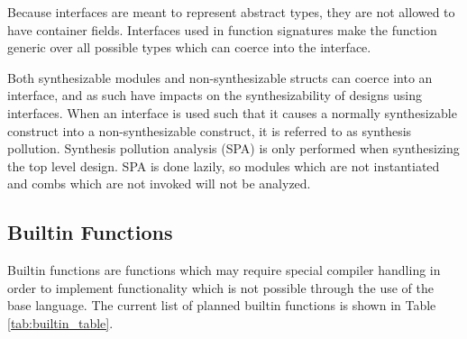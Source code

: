 \documentclass[10pt]{article}
\begin{document}
Because interfaces are meant to represent abstract types, they are not allowed to have container
fields. Interfaces used in function signatures make the function generic over all possible types
which can coerce into the interface.

Both synthesizable modules and non-synthesizable structs can coerce into an interface, and as such
have impacts on the synthesizability of designs using interfaces. When an interface is used such
that it causes a normally synthesizable construct into a non-synthesizable construct, it is referred
to as synthesis pollution. Synthesis pollution analysis (SPA) is only performed when synthesizing the top
level design. SPA is done lazily, so modules which are not instantiated and combs which are not
invoked will not be analyzed.

\subsection{Builtin Functions}
Builtin functions are functions which may require special compiler handling in order to implement
functionality which is not possible through the use of the base language. The current list of
planned builtin functions is shown in Table \ref{tab:builtin_table}.
\end{document}
